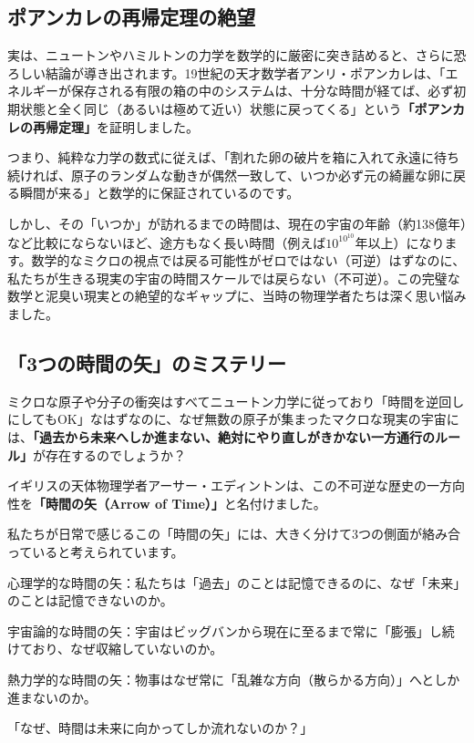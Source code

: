 \subsection{ポアンカレの再帰定理の絶望}

実は、ニュートンやハミルトンの力学を数学的に厳密に突き詰めると、さらに恐ろしい結論が導き出されます。19世紀の天才数学者アンリ・ポアンカレは、「エネルギーが保存される有限の箱の中のシステムは、十分な時間が経てば、必ず初期状態と全く同じ（あるいは極めて近い）状態に戻ってくる」という\textbf{「ポアンカレの再帰定理」}を証明しました。

つまり、純粋な力学の数式に従えば、「割れた卵の破片を箱に入れて永遠に待ち続ければ、原子のランダムな動きが偶然一致して、いつか必ず元の綺麗な卵に戻る瞬間が来る」と数学的に保証されているのです。

しかし、その「いつか」が訪れるまでの時間は、現在の宇宙の年齢（約138億年）など比較にならないほど、途方もなく長い時間（例えば\(10^{10^{10}}\)年以上）になります。数学的なミクロの視点では戻る可能性がゼロではない（可逆）はずなのに、私たちが生きる現実の宇宙の時間スケールでは戻らない（不可逆）。この完璧な数学と泥臭い現実との絶望的なギャップに、当時の物理学者たちは深く思い悩みました。

\subsection{「3つの時間の矢」のミステリー}

ミクロな原子や分子の衝突はすべてニュートン力学に従っており「時間を逆回しにしてもOK」なはずなのに、なぜ無数の原子が集まったマクロな現実の宇宙には、\textbf{「過去から未来へしか進まない、絶対にやり直しがきかない一方通行のルール」}が存在するのでしょうか？

イギリスの天体物理学者アーサー・エディントンは、この不可逆な歴史の一方向性を\textbf{「時間の矢（Arrow of Time）」}と名付けました。

私たちが日常で感じるこの「時間の矢」には、大きく分けて3つの側面が絡み合っていると考えられています。

心理学的な時間の矢：私たちは「過去」のことは記憶できるのに、なぜ「未来」のことは記憶できないのか。

宇宙論的な時間の矢：宇宙はビッグバンから現在に至るまで常に「膨張」し続けており、なぜ収縮していないのか。

熱力学的な時間の矢：物事はなぜ常に「乱雑な方向（散らかる方向）」へとしか進まないのか。

「なぜ、時間は未来に向かってしか流れないのか？」

